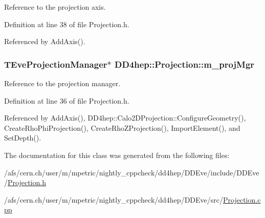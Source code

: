 Reference to the projection axis. 

Definition at line 38 of file Projection.h.

Referenced by AddAxis().\hypertarget{class_d_d4hep_1_1_projection_af3e297ffc1962b82749d48fe43ed6830}{
\subsubsection[{m\_\-projMgr}]{\setlength{\rightskip}{0pt plus 5cm}TEveProjectionManager$\ast$ {\bf DD4hep::Projection::m\_\-projMgr}}}
\label{class_d_d4hep_1_1_projection_af3e297ffc1962b82749d48fe43ed6830}


Reference to the projection manager. 

Definition at line 36 of file Projection.h.

Referenced by AddAxis(), DD4hep::Calo2DProjection::ConfigureGeometry(), CreateRhoPhiProjection(), CreateRhoZProjection(), ImportElement(), and SetDepth().

The documentation for this class was generated from the following files:\begin{DoxyCompactItemize}
\item 
/afs/cern.ch/user/m/mpetric/nightly\_\-cppcheck/dd4hep/DDEve/include/DDEve/\hyperlink{_projection_8h}{Projection.h}\item 
/afs/cern.ch/user/m/mpetric/nightly\_\-cppcheck/dd4hep/DDEve/src/\hyperlink{_projection_8cpp}{Projection.cpp}\end{DoxyCompactItemize}
